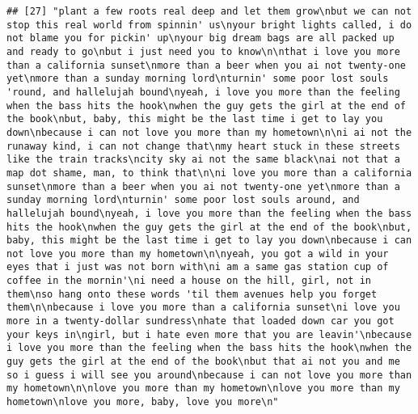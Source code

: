 \documentclass[]{article}
\begin{document}
\begin{verbatim}
## [27] "plant a few roots real deep and let them grow\nbut we can not stop this real world from spinnin' us\nyour bright lights called, i do not blame you for pickin' up\nyour big dream bags are all packed up and ready to go\nbut i just need you to know\n\nthat i love you more than a california sunset\nmore than a beer when you ai not twenty-one yet\nmore than a sunday morning lord\nturnin' some poor lost souls 'round, and hallelujah bound\nyeah, i love you more than the feeling when the bass hits the hook\nwhen the guy gets the girl at the end of the book\nbut, baby, this might be the last time i get to lay you down\nbecause i can not love you more than my hometown\n\ni ai not the runaway kind, i can not change that\nmy heart stuck in these streets like the train tracks\ncity sky ai not the same black\nai not that a map dot shame, man, to think that\n\ni love you more than a california sunset\nmore than a beer when you ai not twenty-one yet\nmore than a sunday morning lord\nturnin' some poor lost souls around, and hallelujah bound\nyeah, i love you more than the feeling when the bass hits the hook\nwhen the guy gets the girl at the end of the book\nbut, baby, this might be the last time i get to lay you down\nbecause i can not love you more than my hometown\n\nyeah, you got a wild in your eyes that i just was not born with\ni am a same gas station cup of coffee in the mornin'\ni need a house on the hill, girl, not in them\nso hang onto these words 'til them avenues help you forget them\n\nbecause i love you more than a california sunset\ni love you more in a twenty-dollar sundress\nhate that loaded down car you got your keys in\ngirl, but i hate even more that you are leavin'\nbecause i love you more than the feeling when the bass hits the hook\nwhen the guy gets the girl at the end of the book\nbut that ai not you and me so i guess i will see you around\nbecause i can not love you more than my hometown\n\nlove you more than my hometown\nlove you more than my hometown\nlove you more, baby, love you more\n"                                                                                                                                                                                                                                                                                                                                                                                                                                                                                                                                                                                                                                                                                                                                                                                                                                                                

\end{verbatim}
\end{document}
